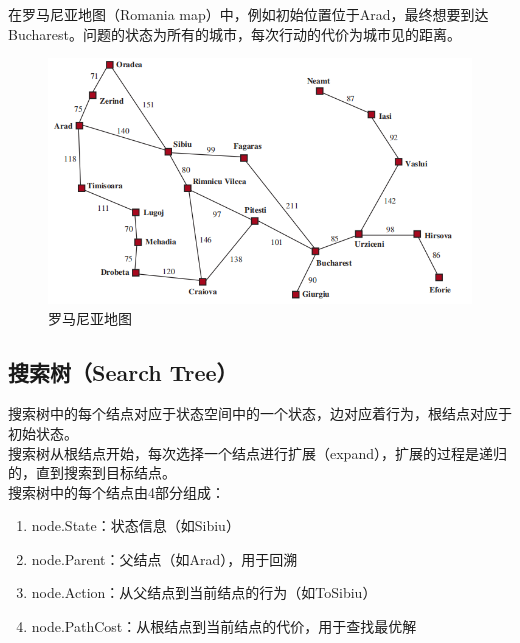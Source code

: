 在罗马尼亚地图（Romania map）中，例如初始位置位于Arad，最终想要到达Bucharest。问题的状态为所有的城市，每次行动的代价为城市见的距离。

\begin{figure}[H]
    \centering
    \includegraphics{img/C1/1-3/2.png}
    \caption{罗马尼亚地图}
\end{figure}

\vspace{0.5cm}

\subsection{搜索树（Search Tree）}

搜索树中的每个结点对应于状态空间中的一个状态，边对应着行为，根结点对应于初始状态。\\

搜索树从根结点开始，每次选择一个结点进行扩展（expand），扩展的过程是递归的，直到搜索到目标结点。\\

搜索树中的每个结点由4部分组成：

\begin{enumerate}
    \item node.State：状态信息（如Sibiu）
    \item node.Parent：父结点（如Arad），用于回溯
    \item node.Action：从父结点到当前结点的行为（如ToSibiu）
    \item node.PathCost：从根结点到当前结点的代价，用于查找最优解
\end{enumerate}


